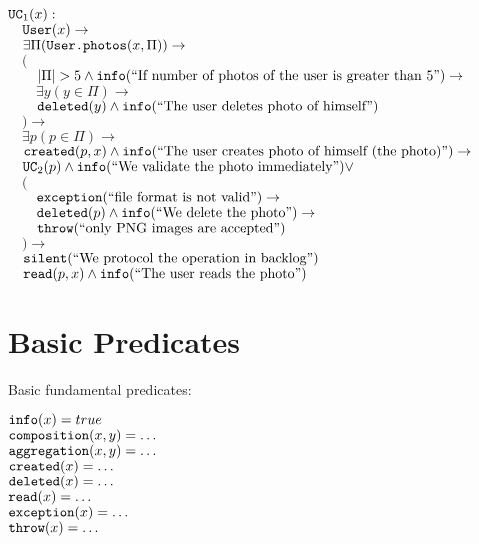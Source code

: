 \documentclass{article}
\begin{document}
    \begin{maths}
    $\mbox{\texttt{UC}}_1(x) : $ \\
    $\quad \mbox{\texttt{User}}(x) \to$ \\
    $\quad \exists \Pi(\mbox{\texttt{User.photos}}(x, \Pi)) \to$ \\
    $\quad ($ \\
    $\quad\quad |\Pi| > 5 \wedge \mbox{\texttt{info}}(\mbox{``If number of photos of the user is greater than 5''})\to$ \\
    $\quad\quad \exists y(y \in \Pi) \to$ \\
    $\quad\quad \mbox{\texttt{deleted}}(y) \wedge \mbox{\texttt{info}}(\mbox{``The user deletes photo of himself''})$ \\
    $\quad ) \to$ \\
    $\quad \exists p(p \in \Pi) \to$ \\
    $\quad \mbox{\texttt{created}}(p, x) \wedge \mbox{\texttt{info}}(\mbox{``The user creates photo of himself (the photo)''})\to$ \\
    $\quad \mbox{\texttt{UC}}_2(p) \wedge \mbox{\texttt{info}}(\mbox{``We validate the photo immediately''}) \vee$ \\
    $\quad ($ \\
    $\quad\quad \mbox{\texttt{exception}}(\mbox{``file format is not valid''}) \to$ \\
    $\quad\quad \mbox{\texttt{deleted}}(p) \wedge \mbox{\texttt{info}}(\mbox{``We delete the photo''})\to$ \\
    $\quad\quad \mbox{\texttt{throw}}(\mbox{``only PNG images are accepted''})$ \\
    $\quad ) \to$ \\
    $\quad \mbox{\texttt{silent}}(\mbox{``We protocol the operation in backlog''})$ \\
    $\quad \mbox{\texttt{read}}(p, x)\wedge \mbox{\texttt{info}}(\mbox{``The user reads the photo''})$ \\
    \end{maths}
    
\newpage
\section{Basic Predicates}

    Basic fundamental predicates:

    \begin{maths}
    $\mbox{\texttt{info}}(x) = true$ \\
    $\mbox{\texttt{composition}}(x, y) = \dots$ \\
    $\mbox{\texttt{aggregation}}(x, y) = \dots$ \\
    $\mbox{\texttt{created}}(x) = \dots$ \\
    $\mbox{\texttt{deleted}}(x) = \dots$ \\
    $\mbox{\texttt{read}}(x) = \dots$ \\
    $\mbox{\texttt{exception}}(x) = \dots$ \\
    $\mbox{\texttt{throw}}(x) = \dots$ \\
    \end{maths}
\end{document}
